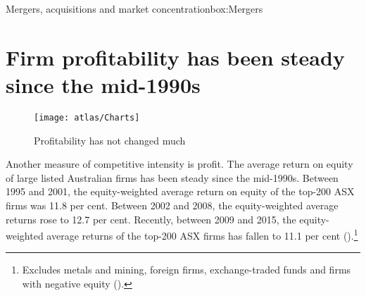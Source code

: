 \begin{bigbox}{Mergers, acquisitions and market concentration}{box:Mergers}

\end{bigbox}



\section{Firm profitability has been steady since the mid-1990s}

\begin{figure}
    \caption{Profitability has not changed much \label{fig:ASXROEspreads}}
  \texttt{[image: atlas/Charts]}
\end{figure}

Another measure of competitive intensity is profit. The average return on equity of large listed Australian firms has been steady since the mid-1990s. Between 1995 and 2001, the equity-weighted average return on equity of the top-200 ASX firms was 11.8 per cent. Between 2002 and 2008, the equity-weighted average returns rose to 12.7 per cent. Recently, between 2009 and 2015, the equity-weighted average returns of the top-200 ASX firms has fallen to 11.1 per cent ().\footnote{Excludes metals and mining, foreign firms, exchange-traded funds and firms with negative equity (\textcite{Morningstar2017}).}

